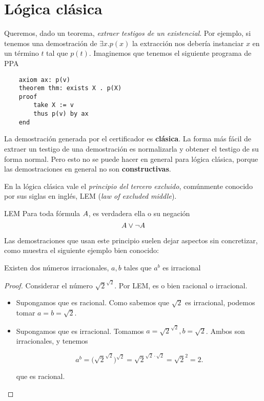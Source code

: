 \section{Lógica clásica}
Queremos, dado un teorema, \textit{extraer testigos de un existencial}. Por
ejemplo, si tenemos una demostración de $\exists x . p(x)$ la extracción nos
debería instanciar $x$ en un término $t$ tal que $p(t)$. Imaginemos que tenemos
el siguiente programa de PPA

\begin{verbatim}
    axiom ax: p(v)
    theorem thm: exists X . p(X)
    proof
        take X := v
        thus p(v) by ax
    end
\end{verbatim}

La demostración generada por el certificador es \textbf{clásica}. La forma más
fácil de extraer un testigo de una demostración es normalizarla y obtener el
testigo de su forma normal. Pero esto no se puede hacer en general para lógica
clásica, porque las demostraciones en general no son \textbf{constructivas}.

En la lógica clásica vale el \textit{principio del tercero excluido}, comúnmente
conocido por sus siglas en inglés, LEM (\textit{law of excluded middle}).

\begin{prop}{LEM} Para toda fórmula $A$, es verdadera ella o su negación
    \[ A \vee \neg A \]
\end{prop}

Las demostraciones que usan este principio suelen dejar aspectos sin
concretizar, como muestra el siguiente ejemplo bien conocido:

\begin{theorem}\label{thm:irrat}
    Existen dos números irracionales, $a, b$ tales que $a^b$ es irracional
\end{theorem}
\begin{proof}
    Considerar el número $\sqrt{2}^{\sqrt{2}}$. Por LEM, es o bien racional o
    irracional.
    \begin{itemize}
        \item Supongamos que es racional. Como sabemos que $\sqrt{2}$ es
        irracional, podemos tomar $a=b=\sqrt{2}$.
        \item Supongamos que es irracional. Tomamos $a = \sqrt{2}^{\sqrt{2}}, b
        = \sqrt{2}$. Ambos son irracionales, y tenemos

        \[
            a^b
            = \Bigg( \sqrt{2}^{\sqrt{2}} \Big)^{\sqrt{2}}
            = \sqrt{2}^{\sqrt{2} \cdot \sqrt{2}}
            = \sqrt{2}^{2}
            = 2.
        \]

        que es racional.
    \end{itemize}
\end{proof}


